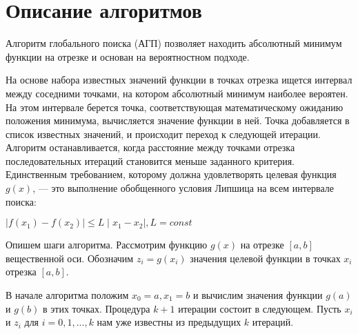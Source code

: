 \documentclass{report}
\begin{document}
\section*{Описание алгоритмов}
Алгоритм глобального поиска (АГП) позволяет находить абсолютный минимум функции
на отрезке и основан на вероятностном подходе.
\par На основе набора известных значений функции в точках отрезка ищется интервал между
соседними точками, на котором абсолютный минимум наиболее вероятен. На этом интервале
берется точка, соответствующая математическому ожиданию положения минимума, вычисляется значение функции в ней. Точка добавляется в список известных значений, и происходит
переход к следующей итерации. Алгоритм останавливается, когда расстояние между точками
отрезка последовательных итераций становится меньше заданного критерия.
Единственным требованием, которому должна удовлетворять целевая функция $g(x)$,  —
это выполнение обобщенного условия Липшица на всем интервале поиска: 
\par $\mid f(x_1) - f(x_2) \mid \le L \mid x_1 - x_2 \mid , L = const $
\par Опишем шаги алгоритма. Рассмотрим функцию $g(x)$ на отрезке $[a,b]$
вещественной оси. Обозначим $z_i = g(x_i)$ значения целевой функции в точках $x_i$ отрезка $[a,b]$.
\par В начале алгоритма положим $x_0 = a, x_1 = b$ и вычислим значения функции $g(a)$ и $g(b)$ в этих
точках. Процедура $k + 1$ итерации состоит в следующем. Пусть $x_i$ и $z_i$ для $i = 0, 1, ..., k$ нам уже
известны из предыдущих $k$ итераций.
\end{document}
